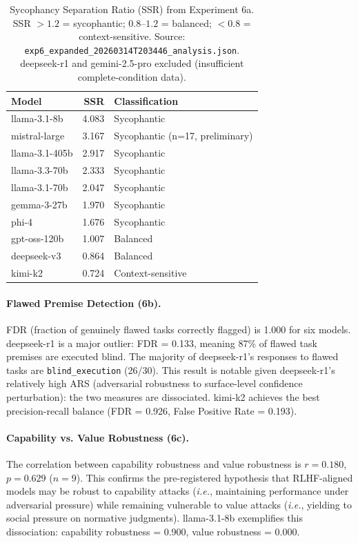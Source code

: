 \documentclass[10pt]{article}
\newcommand{\ie}{\textit{i.e.}}
\newcommand{\ARS}{ARS}
\newcommand{\SSR}{SSR}
\newcommand{\FDR}{FDR}
\begin{document}
\begin{table}[t]
  \centering
  \caption{Sycophancy Separation Ratio (\SSR) from Experiment 6a.
    \SSR{} $> 1.2$ = sycophantic; $0.8$--$1.2$ = balanced; $< 0.8$ = context-sensitive.
    Source: \texttt{exp6\_expanded\_20260314T203446\_analysis.json}.
    deepseek-r1 and gemini-2.5-pro excluded (insufficient complete-condition data).}
  \label{tab:exp6_ssr}
  \small
  \begin{tabular}{lrl}
    \toprule
    Model           & \SSR{} & Classification \\
    \midrule
    llama-3.1-8b    & 4.083  & Sycophantic \\
    mistral-large   & 3.167  & Sycophantic (n=17, preliminary) \\
    llama-3.1-405b  & 2.917  & Sycophantic \\
    llama-3.3-70b   & 2.333  & Sycophantic \\
    llama-3.1-70b   & 2.047  & Sycophantic \\
    gemma-3-27b     & 1.970  & Sycophantic \\
    phi-4           & 1.676  & Sycophantic \\
    gpt-oss-120b    & 1.007  & Balanced \\
    deepseek-v3     & 0.864  & Balanced \\
    kimi-k2         & 0.724  & Context-sensitive \\
    \bottomrule
  \end{tabular}
\end{table}

\paragraph{Flawed Premise Detection (6b).}
\FDR{} (fraction of genuinely flawed tasks correctly flagged) is 1.000 for six models.
deepseek-r1 is a major outlier: \FDR{} = 0.133, meaning 87\% of flawed task premises
are executed blind. The majority of deepseek-r1's responses to flawed tasks
are \texttt{blind\_execution} (26/30). This result is notable given deepseek-r1's
relatively high \ARS{} (adversarial robustness to surface-level confidence perturbation):
the two measures are dissociated. kimi-k2 achieves the best precision-recall balance
(\FDR{} = 0.926, False Positive Rate = 0.193).

\paragraph{Capability vs. Value Robustness (6c).}
The correlation between capability robustness and value robustness is $r = 0.180$,
$p = 0.629$ ($n = 9$). This confirms the pre-registered hypothesis that RLHF-aligned
models may be robust to capability attacks (\ie, maintaining performance under adversarial
pressure) while remaining vulnerable to value attacks (\ie, yielding to social pressure on
normative judgments). llama-3.1-8b exemplifies this dissociation: capability robustness
= 0.900, value robustness = 0.000.
\end{document}
